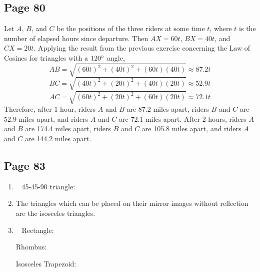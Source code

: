 \documentclass{article}
\newenvironment{solutions}[1]
{\subsection*{#1}
 \begin{enumerate}[leftmargin=1.5em]}
{\end{enumerate}}
\newcommand{\solution}{\item}
\begin{document}
\begin{solutions}{Page 80}
Let $A$, $B$, and $C$ be the positions of the three riders at some time $t$, where $t$ is the number of elapsed hours since departure. Then $AX=60t$, $BX=40t$, and $CX=20t$. Applying the result from the previous exercise concerning the Law of Cosines for triangles with a $120\degree$ angle,
\[
AB = \sqrt{\left(60t\right)^2+\left(40t\right)^2 + \left(60t\right)\left(40t\right)} \approx 87.2t
\]
\[
BC = \sqrt{\left(40t\right)^2+\left(20t\right)^2 + \left(40t\right)\left(20t\right)} \approx 52.9t
\]
\[
AC = \sqrt{\left(60t\right)^2+\left(20t\right)^2 + \left(60t\right)\left(20t\right)} \approx 72.1t
\]
Therefore, after 1 hour, riders $A$ and $B$ are 87.2 miles apart, riders $B$ and $C$ are 52.9 miles apart, and riders $A$ and $C$ are 72.1 miles apart. After 2 hours, riders $A$ and $B$ are 174.4 miles apart, riders $B$ and $C$ are 105.8 miles apart, and riders $A$ and $C$ are 144.2 miles apart.
\end{solutions}

\begin{solutions}{Page 83}
\solution ~ %
45-45-90 triangle:
\begin{center}
\end{center}

\solution %
The triangles which can be placed on their mirror images without reflection are the isosceles triangles.

\solution ~ %
Rectangle:
\begin{center}
\end{center}

Rhombus:
\begin{center}
\end{center}

Isosceles Trapezoid:
\begin{center}
\end{center}
\end{solutions}
\end{document}
